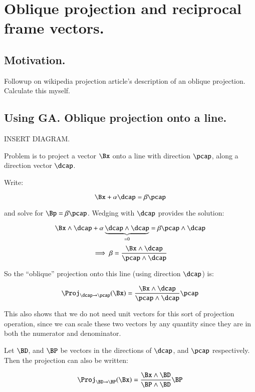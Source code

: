 \chapter{Oblique projection and reciprocal frame vectors.}

\section{Motivation. }

Followup on wikipedia projection article's description of an oblique
projection.  Calculate this myself.

\section{Using GA.  Oblique projection onto a line. }

INSERT DIAGRAM.

Problem is to project a vector $\Bx$ onto a line with direction $\pcap$, along a direction vector $\dcap$.

Write:

\begin{equation}\label{eqn:oblique_proj:solveForprojLineUnit}
\Bx + \alpha \dcap = \beta \pcap
\end{equation}

and solve for $\Bp = \beta \pcap$.  Wedging with $\dcap$ provides the solution:

\[
\Bx \wedge \dcap + \alpha \underbrace{\dcap \wedge \dcap}_{=0} = \beta \pcap \wedge \dcap
\]
\[
\implies
\beta = \frac{\Bx \wedge \dcap}{\pcap \wedge \dcap}
\]

So the ``oblique'' projection onto this line (using direction $\dcap$) is:

\begin{equation}
\Proj_{\dcap \rightarrow \pcap}(\Bx) =
\frac{\Bx \wedge \dcap}{\pcap \wedge \dcap} \pcap
\end{equation}

This also shows that we do not need unit vectors for this sort of projection
operation, since we can scale these two vectors by any quantity since they are
in both the numerator and denominator.

Let $\BD$, and $\BP$ be vectors in the directions of $\dcap$, and $\pcap$ respectively.  Then the projection can also be written:

\begin{equation}\label{eqn:oblique_proj:obliqueGAproj}
\Proj_{\BD \rightarrow \BP}(\Bx) =
\frac{\Bx \wedge \BD}{\BP \wedge \BD} \BP
\end{equation}

